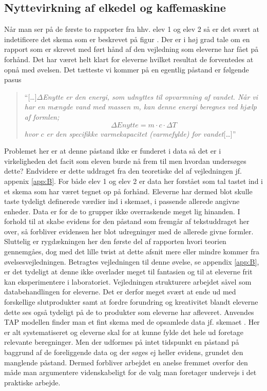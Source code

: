 \subsection*{Nyttevirkning af elkedel og kaffemaskine}
Når man ser på de første to rapporter fra hhv. elev 1 og elev 2 så er det svært at indetificere det skema som er beskrevet på figur . Der er i høj grad tale om en rapport som er skrevet med ført hånd af den vejledning som eleverne har fået på forhånd. Det har været helt klart for eleverne hvilket resultat de forventedes at opnå med øvelsen. Det tætteste vi kommer på en egentlig påstand er følgende pasus
\begin{quote}
	``[\ldots]\emph{$\Delta$Enytte er den energi, som udnyttes til opvarmning af vandet. Når vi har en mængde vand med massen m, kan denne energi beregnes ved hjælp af formlen;
	\begin{equation*}
	\Delta Enytte = m\cdot c\cdot \Delta T
	\end{equation*}
	hvor $c$ er den specifikke varmekapacitet (varmefylde) for vandet}[\ldots]''
\end{quote}
Problemet her er at denne påstand ikke er funderet i data så det er i virkeligheden det facit som eleven burde nå frem til men hvordan undersøges dette? Endvidere er dette uddraget fra den teoretiske del af vejledningen jf. appenix \vref{app:B}. For både elev 1 og elev 2 er data her forstået som tal tastet ind i et skema som har været tegnet op på forhånd. Eleverne har dermed blot skulle taste tydeligt definerede værdier ind i skemaet, i passende allerede angivne enheder. Data er for de to grupper ikke overraskende meget lig hinanden. I forhold til at skabe evidens for den påstand som fremgår af tekstuddraget her over, så forbliver evidensen her blot udregninger med de allerede givne formler. Sluttelig er rygdækningen her den første del af rapporten hvori teorien gennemgåes, dog med det lille twist at dette afsnit mere eller mindre kommer fra øvelsesvejledningen. Betragtes vejledningen til denne øvelse, se appendix \vref{app:B}, er det tydeligt at denne ikke overlader meget til fantasien og til at eleverne frit kan eksperimentere i laboratoriet. Vejledningen strukturere arbejdet såvel som databehandlingen for eleverne. Det er derfor meget svært at ende ud med forskellige slutprodukter samt at fordre forundring og kreativitet blandt eleverne dette ses også tydeligt på de to produkter som eleverne har afleveret. 
Anvendes TAP modellen finder man et fint skema med de opsamlede data jf. skemaet . Her er alt systematiseret og eleverne skal for at kunne fylde det hele ud foretage relevante beregninger. 
Men der udformes på intet tidspunkt en påstand på baggrund af de foreliggende data og der søges ej heller evidens, grundet den manglende påstand. Dermed forbliver arbejdet en anelse fremmet overfor den måde man argumentere videnskabeligt for de valg man foretager undervejs i det praktiske arbejde. 

